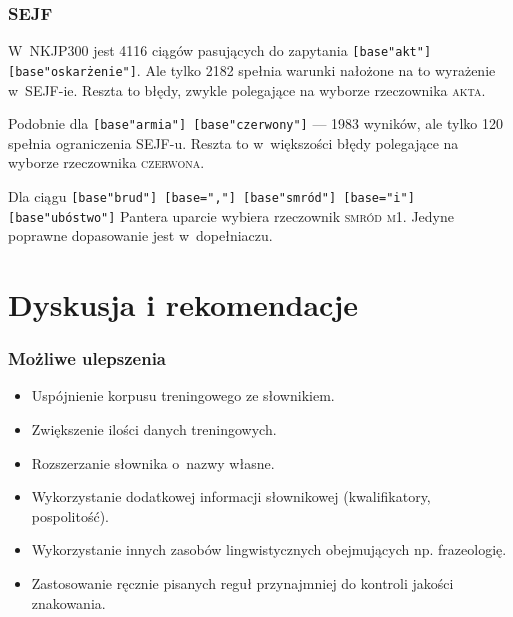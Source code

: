 \documentclass[xcolor=dvipsnames,polish]{beamer}
\newcommand{\textapprox}{\raisebox{0.5ex}{\texttildelow}}
\begin{document}
\begin{frame}
\frametitle{SEJF}
W~NKJP300 jest 4116 ciągów pasujących do zapytania
\texttt{[base\textapprox "akt"] [base\textapprox "oskarżenie"]}. Ale tylko 2182 spełnia
warunki nałożone na to wyrażenie w~SEJF-ie. Reszta to błędy, zwykle
polegające na wyborze rzeczownika \textsc{akta}.

\bigskip
\pause

Podobnie dla \texttt{[base\textapprox"armia"] [base\textapprox"czerwony"]} --- 1983
wyników, ale tylko 120 spełnia ograniczenia SEJF-u. Reszta to
w~większości błędy polegające na wyborze rzeczownika
\textsc{czerwona}.

\bigskip
\pause

Dla ciągu \texttt{[base\textapprox"brud"] [base=","]
  [base\textapprox"smród"] [base="i"] [base\textapprox"ubóstwo"]}
Pantera uparcie wybiera rzeczownik \textsc{smród} \textsc{m1}. Jedyne
poprawne dopasowanie jest w~dopełniaczu.

\end{frame}


\section{Dyskusja i rekomendacje}
\frame{\sectionpage}

\begin{frame}
  \frametitle{Możliwe ulepszenia}

  \begin{itemize}
  \item Uspójnienie korpusu treningowego ze słownikiem.
  \item Zwiększenie ilości danych treningowych.
  \item Rozszerzanie słownika o~nazwy własne.
  \item Wykorzystanie dodatkowej informacji słownikowej
    (kwalifikatory, pospolitość).
  \item Wykorzystanie innych zasobów lingwistycznych obejmujących
    np. frazeologię.
  \item Zastosowanie ręcznie pisanych reguł \pauza przynajmniej do
    kontroli jakości znakowania.
  \end{itemize}


\end{frame}
\end{document}
